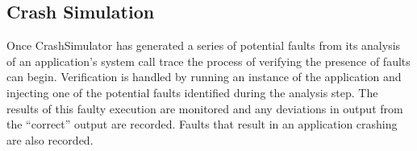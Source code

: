     \subsection{Crash Simulation}

        Once CrashSimulator has generated a series of potential faults from its analysis of an application's system call
        trace the process of verifying the presence of faults can begin. Verification is handled by running an instance
        of the application and injecting one of the potential faults identified during the analysis step.  The results
        of this faulty execution are monitored and any deviations in output from the ``correct'' output are recorded.
        Faults that result in an application crashing are also recorded.
